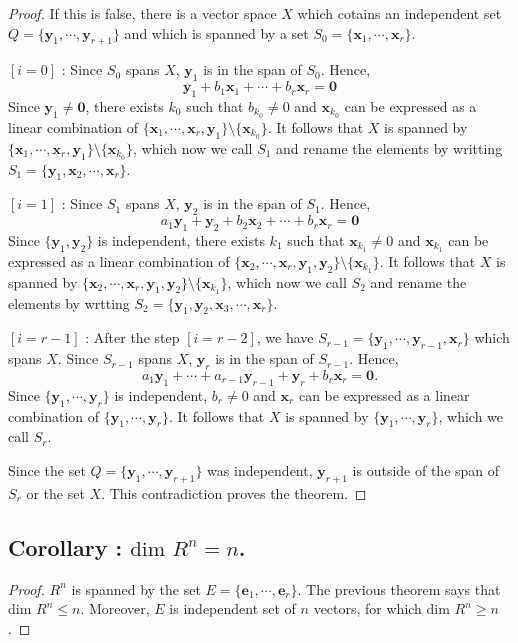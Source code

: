 \documentclass{article}
\renewcommand\dim{\ensuremath{\text{dim }}}
\newcommand\be{\ensuremath{\boldsymbol e}}
\newcommand\bx{\ensuremath{\boldsymbol x}}
\newcommand\by{\ensuremath{\boldsymbol y}}
\newcommand\bzero{\ensuremath{\boldsymbol 0}}
\begin{document}
\begin{proof}
If this is false, there is a vector space \(X\) which cotains an independent set \(Q=\{\by_1,\cdots,\by_{r+1}\}\) and which is spanned by a set \(S_0=\{\bx_1,\cdots,\bx_r\}\).

\([i=0]\) :
Since \(S_0\) spans \(X\), \(\by_1\) is in the span of \(S_0\).
Hence,
\[\by_1+b_1\bx_1+\cdots+b_r\bx_r=\bzero\]
Since \(\by_1\neq\bzero\), there exists \(k_0\) such that \(b_{k_0}\neq0\)
and \(\bx_{k_0}\) can be expressed as a linear combination of \(\{\bx_1,\cdots,\bx_r,\by_1\}\setminus\{\bx_{k_0}\}\).
It follows that \(X\) is spanned by  \(\{\bx_1,\cdots,\bx_r,\by_1\}\setminus\{\bx_{k_0}\}\), which now we call \(S_1\) and rename the elements by writting \(S_1=\{\by_1,\bx_2,\cdots,\bx_r\}\).

\([i=1]\) : Since \(S_1\) spans \(X\), \(\by_2\) is in the span of \(S_1\).
Hence,
\[a_1\by_1+\by_2+b_2\bx_2+\cdots+b_r\bx_r=\bzero\]
Since \(\{\by_1,\by_2\}\) is independent, there exists \(k_1\) such that \(\bx_{k_1}\neq0\) and \(\bx_{k_1}\) can be expressed as a linear combination of \(\{\bx_2,\cdots,\bx_r,\by_1,\by_2\}\setminus\{\bx_{k_1}\}\).
It follows that \(X\) is spanned by \(\{\bx_2,\cdots,\bx_r,\by_1,\by_2\}\setminus\{\bx_{k_1}\}\), which now we call \(S_2\) and rename the elements by wrtting \(S_2=\{\by_1,\by_2,\bx_3,\cdots,\bx_r\}\).

\([i=r-1]\) :
After the step \([i=r-2]\), we have \(S_{r-1}=\{\by_1,\cdots,\by_{r-1},\bx_r\}\) which spans \(X\).
Since \(S_{r-1}\) spans \(X\), \(\by_r\)  is in the span of \(S_{r-1}\).
Hence,
\[a_1\by_1+\cdots+a_{r-1}\by_{r-1}+\by_r+b_r\bx_r=\bzero.\]
Since \(\{\by_1,\cdots,\by_r\}\) is independent, \(b_r\neq0\) and \(\bx_r\) can be expressed as a linear combination of  \(\{\by_1,\cdots,\by_r\}\).
It follows that \(X\) is spanned by \(\{\by_1,\cdots,\by_r\}\), which we call \(S_r\).

Since the set \(Q=\{\by_1,\cdots,\by_{r+1}\}\) was independent, \(\by_{r+1}\) is outside of the span of \(S_r\) or the set \(X\).
This contradiction proves the theorem.
\end{proof}

\subsection*{Corollary : \(\dim R^n=n\).}

\begin{proof}
\(R^n\) is spanned by the set \(E=\{\be_1,\cdots,\be_r\}\).
The previous theorem says that \(\dim R^n\le n\).
Moreover, \(E\) is independent set of \(n\) vectors, for which \(\dim R^n\ge n\).
\end{proof}
\end{document}
